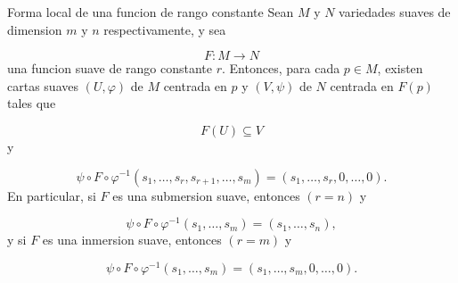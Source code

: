 \begin{booktheorem}{Forma local de una funcion de rango constante}
Sean $M$ y $N$ variedades suaves de dimension $m$ y $n$ respectivamente, y sea

\[
F:M\to N
\]
una funcion suave de rango constante $r$. Entonces, para cada $p\in M$, existen cartas suaves $(U,\varphi)$ de $M$ centrada en $p$ y $(V,\psi)$ de $N$ centrada en $F(p)$ tales que

\[
F(U)\subseteq V
\]
y

\[
\psi\circ F\circ \varphi^{-1}(s_1,\ldots,s_r,s_{r+1},\ldots,s_m)=(s_1,\ldots,s_r,0,\ldots,0).
\]
En particular, si $F$ es una submersion suave, entonces $(r=n)$ y

\[
\psi\circ F\circ \varphi^{-1}(s_1,\ldots,s_m)=(s_1,\ldots,s_n),
\]
y si $F$ es una inmersion suave, entonces $(r=m)$ y

\[
\psi\circ F\circ \varphi^{-1}(s_1,\ldots,s_m)=(s_1,\ldots,s_m,0,\ldots,0).
\]
\end{booktheorem}
